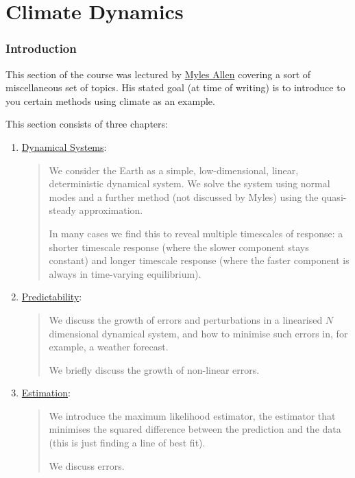 \part{Climate Dynamics}\label{Climate Dynamics}

\section*{Introduction}

This section of the course was lectured by \href{https://www.physics.ox.ac.uk/our-people/allenm}{Myles Allen} covering a sort of miscellaneous set of topics. His stated goal (at time of writing) is to introduce to you certain methods using climate as an example. \vspace{5 mm}

\noindent This section consists of three chapters:\vspace{5 mm}

\begin{enumerate}
    \item \hyperref[Dynamical Systems]{Dynamical Systems}: 
        
        \begin{quote}
            We consider the Earth as a simple, low-dimensional, linear, deterministic dynamical system. We solve the system using normal modes and a further method (not discussed by Myles) using the quasi-steady approximation.

            In many cases we find this to reveal multiple timescales of response: a shorter timescale response (where the slower component stays constant) and longer timescale response (where the faster component is always in time-varying equilibrium).
        \end{quote}

    \item \hyperref[Predictability]{Predictability}: 
    
        \begin{quote}
            We discuss the growth of errors and perturbations in a linearised $N$ dimensional dynamical system, and how to minimise such errors in, for example, a weather forecast.

            We briefly discuss the growth of non-linear errors.
        \end{quote}
    
    \item \hyperref[Estimation]{Estimation}:
        
        \begin{quote}
            We introduce the maximum likelihood estimator, the estimator that minimises the squared difference between the prediction and the data (this is just finding a line of best fit).

            We discuss errors.
        \end{quote}
\end{enumerate}


